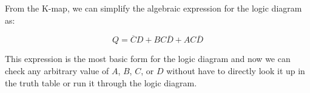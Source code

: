 \begin{example}
    From the K-map, we can simplify the algebraic expression for the logic diagram as:

    \begin{equation*}
        Q = \overline{C}D + BC\overline{D} + AC\overline{D}
    \end{equation*}

    This expression is the most basic form for the logic diagram and now we can check any arbitrary value of $A$, $B$, $C$, or $D$ without have to directly look it up in the truth table or run it through the logic diagram.
\end{example}


